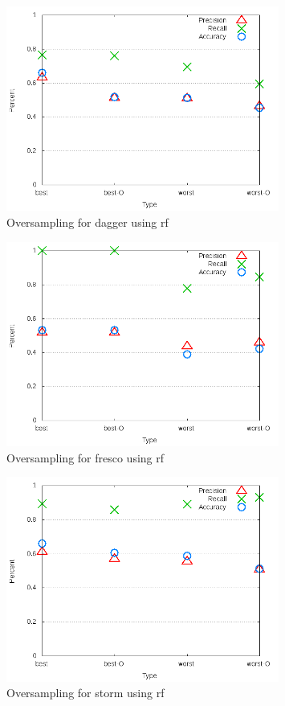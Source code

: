 \begin{figure}[!ht]
    \centering
        \includegraphics[width=0.8\textwidth]{images/rf/test_4/dagger_sample_range}
        \caption{Oversampling for dagger using \gls{rf}}
        \label{fig:test_4_dagger_rf}
\end{figure}

\begin{figure}[!ht]
    \centering
        \includegraphics[width=0.8\textwidth]{images/rf/test_4/fresco_sample_range}
        \caption{Oversampling for fresco using \gls{rf}}
        \label{fig:test_4_fresco_rf}
\end{figure}

\begin{figure}[!ht]
    \centering
        \includegraphics[width=0.8\textwidth]{images/rf/test_4/storm_sample_range}
        \caption{Oversampling for storm using \gls{rf}}
        \label{fig:test_4_storm_rf}
\end{figure}

